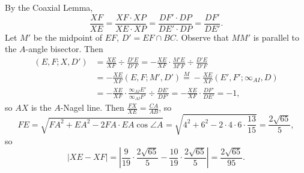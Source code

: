 By the Coaxial Lemma, \[\frac{XF}{XE}=\frac{XF\cdot XP}{XE\cdot XP}=\frac{DF'\cdot DP}{DE'\cdot DP}=\frac{DF'}{DE'}.\] Let $M'$ be the midpoint of $EF$, $D'=EF\cap BC$. Observe that $MM'$ is parallel to the $A$-angle bisector. Then
\begin{align*}
\left(E,F;X,D'\right)&=\frac{XE}{XF}\div\frac{D'E}{D'F}=-\frac{XE}{XF}\cdot\frac{M'E}{M'F}\div\frac{D'E}{D'F}\\
&=-\frac{XE}{XF}\left(E,F;M',D'\right)\stackrel{M}{=}-\frac{XE}{XF}\left(E',F';\infty_{AI},D\right)\\
&=-\frac{XE}{XF}\cdot\frac{\infty_{AI}E'}{\infty_{AI}F'}\div\frac{DE'}{DF'}=-\frac{XE}{XF}\cdot\frac{DF'}{DE'}=-1,
\end{align*}
so $AX$ is the $A$-Nagel line. Then $\frac{FX}{XE}=\frac{CA}{AB}$, so \[FE=\sqrt{FA^2+EA^2-2FA\cdot EA\cos\angle{A}}=\sqrt{4^2+6^2-2\cdot4\cdot6\cdot\frac{13}{15}}=\frac{2\sqrt{65}}{5},\] so \[\left|XE-XF\right|=\left|\frac{9}{19}\cdot\frac{2\sqrt{65}}{5}-\frac{10}{19}\cdot\frac{2\sqrt{65}}{5}\right|=\boxed{\frac{2\sqrt{65}}{95}}.\]